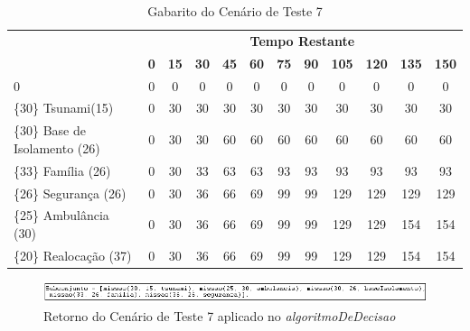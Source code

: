 \begin{table}[!h]
\centering
\caption{Gabarito do Cenário de Teste 7}
\label{gabarito7}
\begin{tabular}{lccccccccccc}
\multicolumn{1}{c}{\cellcolor[HTML]{00D2CB}} & \multicolumn{11}{c}{\cellcolor[HTML]{00D2CB}\textbf{Tempo Restante}} \\ 
\multicolumn{1}{c}{\cellcolor[HTML]{00D2CB}{\color[HTML]{333333} \textbf{\{Valor\} Missão(Tempo)}}} & 
\multicolumn{1}{l}{\cellcolor[HTML]{C0F2F0}\textbf{0}} & 
\multicolumn{1}{l}{\cellcolor[HTML]{C0F2F0}\textbf{15}} & 
\multicolumn{1}{l}{\cellcolor[HTML]{C0F2F0}\textbf{30}} & 
\multicolumn{1}{l}{\cellcolor[HTML]{C0F2F0}\textbf{45}} & 
\multicolumn{1}{l}{\cellcolor[HTML]{C0F2F0}\textbf{60}} & 
\multicolumn{1}{l}{\cellcolor[HTML]{C0F2F0}\textbf{75}} & 
\multicolumn{1}{l}{\cellcolor[HTML]{C0F2F0}\textbf{90}} & 
\multicolumn{1}{l}{\cellcolor[HTML]{C0F2F0}\textbf{105}} & 
\multicolumn{1}{l}{\cellcolor[HTML]{C0F2F0}\textbf{120}} & 
\multicolumn{1}{l}{\cellcolor[HTML]{C0F2F0}\textbf{135}} & 
\multicolumn{1}{l}{\cellcolor[HTML]{C0F2F0}\textbf{150}} \\ 
0 & 0 & 0 & 0 & 0 & 0 & 0 & 0 & 0 & 0 & 0 & 0  \\ 
\{30\}  Tsunami(15) & 0 & 30 & 30 & 30 & 30 & 30 & 30 & 30 & 30 & 30 & 30 \\ 
\{30\}  Base de Isolamento (26) & 0 & 30 & 30 & 60 & 60  & 60  & 60  & 60 & 60 & 60 & 60 \\ 
\{33\}  Família (26) & 0 & 30 & 33 & 63 & 63  & 93  & 93 & 93 & 93 & 93 & 93 \\ 
\{26\}  Segurança (26) & 0 & 30 & 36 & 66 & 69  & 99  & 99 & 129 & 129 & 129 & 129 \\ 
\{25\}  Ambulância (30) & 0 & 30 & 36 & 66 & 69  & 99  & 99 & 129 & 129 & 154 & 154 \\ 
{\color[HTML]{FE0000} \{20\}  Realocação (37)} & 0 & 30 & 36 & 66 & 69  & 99  & 99 & 129 & 129 & 154 & 154 \\  
\end{tabular}
\end{table}


\FloatBarrier
\begin{figure}[!h]
\centering
\includegraphics[keepaspectratio=true,scale=0.7]{figuras/resultado7.png}
\caption{Retorno do Cenário de Teste 7 aplicado no \textit{algoritmoDeDecisao}}
\label{resultado7}
\end{figure}


